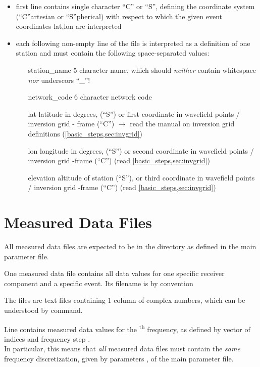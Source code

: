 \begin{itemize}
\item first line contains single character ``C'' or ``S'', defining the coordinate system (``C''artesian or ``S''pherical)
  with respect to which the given event coordinates lat,lon are interpreted
\item each following non-empty line of the file is interpreted as a definition of one station and must 
  contain the following space-separated values:
  \begin{itemize}
  \item[station\_name] 5 character name, which should \emph{neither} contain whitespace \emph{nor} underscors ``\_''!
  \item[network\_code] 6 character network code
  \item[lat] latitude in degrees,  (``S'') or first coordinate in 
    wavefield points / inversion grid - frame (``C'') $\rightarrow$  read the manual on inversion grid definitions 
    (\ref{basic_steps,sec:invgrid})
  \item[lon] longitude in degrees,  (``S'') or second  coordinate in 
    wavefield points / inversion grid -frame (``C'') (read \ref{basic_steps,sec:invgrid})
  \item[elevation] altitude of station (``S''), or third coordinate in wavefield points / inversion grid -frame (``C'') (read \ref{basic_steps,sec:invgrid})
  \end{itemize}
\end{itemize}
%
\section{Measured Data Files} \label{files,sec:measured_data}
%
All measured data files are expected to be in the directory  as defined
in the main parameter file.

One measured data file contains all data values for one specific receiver component and a specific event.
Its filename is by convention 

The files are text files containing $1$ column of  complex numbers, 
which can be understood by   command.

Line  contains measured data values for the \textsuperscript{th} frequency, as defined by vector
of indices  and frequency step . \\
In particular, this means that \emph{all} measured data files must contain the \emph{same} frequency discretization, given
by parameters ,  of the main 
parameter file.
%
